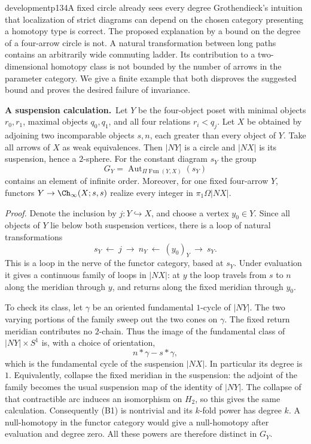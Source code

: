 \begin{dcomment}{development}{p134}{A fixed circle already sees every degree}
Grothendieck's intuition that localization of strict diagrams can depend on the chosen category presenting a homotopy type is correct. The proposed explanation by a bound on the degree of a four-arrow circle is not. A natural transformation between long paths contains an arbitrarily wide commuting ladder. Its contribution to a two-dimensional homotopy class is not bounded by the number of arrows in the parameter category. We give a finite example that both disproves the suggested bound and proves the desired failure of invariance.

\textbf{A suspension calculation.}\ours\ Let $Y$ be the four-object poset with minimal objects $r_0,r_1$, maximal objects $q_0,q_1$, and all four relations $r_i<q_j$. Let $X$ be obtained by adjoining two incomparable objects $s,n$, each greater than every object of $Y$. Take all arrows of $X$ as weak equivalences. Then $|NY|$ is a circle and $|NX|$ is its suspension, hence a $2$-sphere. For the constant diagram $s_Y$ the group
\[
 G_Y=\operatorname{Aut}_{\Pi\operatorname{Fun}(Y,X)}(s_Y)
\]
contains an element of infinite order. Moreover, for one fixed four-arrow $Y$, functors $Y\to\Ch_\infty(X;s,s)$ realize every integer in $\pi_1\Omega|NX|$.

\emph{Proof.} Denote the inclusion by $j:Y\hookrightarrow X$, and choose a vertex $y_0\in Y$. Since all objects of $Y$ lie below both suspension vertices, there is a loop of natural transformations
\[
 s_Y\ \longleftarrow\ j\ \longrightarrow\ n_Y
       \ \longleftarrow\ (y_0)_Y\ \longrightarrow\ s_Y.       \tag{B1}
\]
This is a loop in the nerve of the functor category, based at $s_Y$. Under evaluation it gives a continuous family of loops in $|NX|$: at $y$ the loop travels from $s$ to $n$ along the meridian through $y$, and returns along the fixed meridian through $y_0$.

To check its class, let $\gamma$ be an oriented fundamental $1$-cycle of $|NY|$. The two varying portions of the family sweep out the two cones on $\gamma$. The fixed return meridian contributes no $2$-chain. Thus the image of the fundamental class of $|NY|\times S^1$ is, with a choice of orientation,
\[
                    n*\gamma-s*\gamma,
\]
which is the fundamental cycle of the suspension $|NX|$. In particular its degree is $1$. Equivalently, collapse the fixed meridian in the suspension: the adjoint of the family becomes the usual suspension map of the identity of $|NY|$. The collapse of that contractible arc induces an isomorphism on $H_2$, so this gives the same calculation. Consequently (B1) is nontrivial and its $k$-fold power has degree $k$. A null-homotopy in the functor category would give a null-homotopy after evaluation and degree zero. All these powers are therefore distinct in $G_Y$.


\end{dcomment}
